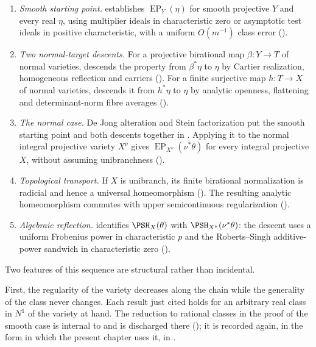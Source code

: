 \begin{enumerate}
\item \emph{Smooth starting point.}
       establishes
      $\operatorname{EP}_Y(\eta)$ for smooth projective $Y$ and every real
      $\eta$, using multiplier ideals in characteristic zero or asymptotic
      test ideals in positive characteristic, with a uniform
      $O(m^{-1})$ class error ().
\item \emph{Two normal-target descents.}
      For a projective birational map $\beta:Y\to T$ of normal varieties,
       descends the property from
      $\beta^*\eta$ to $\eta$ by Cartier realization, homogeneous
      reflection and carriers
      ().
      For a finite surjective map $h:T\to X$ of normal varieties,
       descends it from $h^*\eta$ to
      $\eta$ by analytic openness, flattening and determinant-norm fibre
      averages ().
\item \emph{The normal case.}
      De Jong alteration and Stein factorization put the smooth starting
      point and both descents together in .
      Applying it to the normal integral projective variety $X^\nu$ gives
      $\operatorname{EP}_{X^\nu}(\nu^*\theta)$ for every integral
      projective $X$, without assuming unibranchness
      ().
\item \emph{Topological transport.}
      If $X$ is unibranch, its finite birational normalization is radicial
      and hence a universal homeomorphism
      ().
      The resulting analytic homeomorphism commutes with upper
      semicontinuous regularization ().
\item \emph{Algebraic reflection.}
       identifies
      $\PSH_X(\theta)$ with $\PSH_{X^\nu}(\nu^*\theta)$: the descent
      uses a uniform Frobenius power in characteristic $p$ and the
      Roberts--Singh additive-power sandwich in characteristic zero
      ().
\end{enumerate}

Two features of this sequence are structural rather than incidental.

First, the regularity of the variety decreases along the chain while the
generality of the class never changes.  Each result just cited
holds for an arbitrary real class in $N^1$ of the variety at hand.  The
reduction to rational classes in the proof of the smooth case is internal to
 and is discharged there
(); it is
recorded again, in the form in which the present chapter uses it, in
.


